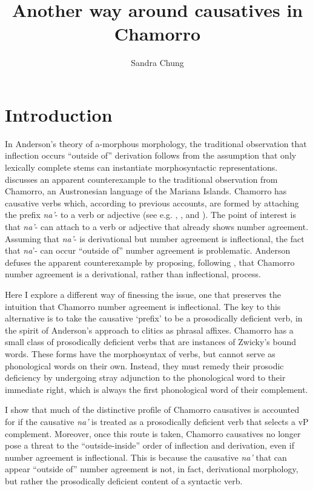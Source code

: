\documentclass[output=paper,
modfonts
]{LSP/langsci}
\title{Another way around causatives in Chamorro}
\author{%
 Sandra Chung\affiliation{University of California, Santa Cruz}
}
\begin{document}
\maketitle

\section{Introduction}

In Anderson's theory of a-morphous morphology, the traditional
observation that inflection occurs ``outside of'' derivation follows
from the assumption that only lexically complete stems can instantiate
morphosyntactic representations. \citet[127--128]{anderson1992} discusses an
apparent counterexample to the traditional observation from Chamorro, an
Austronesian language of the Mariana Islands. Chamorro has causative
verbs which, according to previous accounts, are formed by attaching the
prefix \emph{na'}- to a verb or adjective (see e.g. \citealt{baker1985,gibson1980}, \citealt[108]{safford1904}, and \citealt[247--249]{topping1973}). The
point of interest is that \emph{na'}- can attach to a verb or adjective
that already shows number agreement. Assuming that \emph{na'}- is
derivational but number agreement is inflectional, the fact that
\emph{na}'- can occur ``outside of'' number agreement is problematic.
Anderson defuses the apparent counterexample by proposing, following
\citet[364--365]{durie1986}, that Chamorro number agreement is a derivational,
rather than inflectional, process.

Here I explore a different way of finessing the issue, one that
preserves the intuition that Chamorro number agreement is inflectional.
The key to this alternative is to take the causative `prefix' to be a
prosodically deficient verb, in the spirit of Anderson's \citeyear{anderson2005} approach
to clitics as phrasal affixes. Chamorro has a small class of
prosodically deficient verbs that are instances of Zwicky's \citeyear{zwicky1977a} bound
words. These forms have the morphosyntax of verbs, but cannot serve as
phonological words on their own. Instead, they must remedy their
prosodic deficiency by undergoing stray adjunction to the phonological
word to their immediate right, which is always the first phonological
word of their complement.

I show that much of the distinctive profile of Chamorro causatives is
accounted for if the causative \emph{na'} is treated as a prosodically
deficient verb that selects a vP complement. Moreover, once this route
is taken, Chamorro causatives no longer pose a threat to the
``outside-inside'' order of inflection and derivation, even if number
agreement is inflectional. This is because the causative \emph{na'} that
can appear ``outside of'' number agreement is not, in fact, derivational
morphology, but rather the prosodically deficient content of a syntactic
verb.
\end{document}
